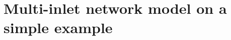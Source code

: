 \chapter{Multi-inlet network model on a simple example}
\label{multi_inlet_network_model_simple_example}